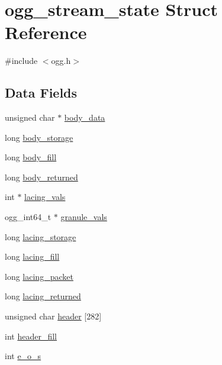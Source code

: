 \hypertarget{structogg__stream__state}{}\section{ogg\+\_\+stream\+\_\+state Struct Reference}
\label{structogg__stream__state}


{\ttfamily \#include $<$ogg.\+h$>$}

\subsection*{Data Fields}
\begin{DoxyCompactItemize}
\item 
unsigned char $\ast$ \hyperlink{structogg__stream__state_a70d03b6f99c1d1e57f55e800b087dae8}{body\+\_\+data}
\item 
long \hyperlink{structogg__stream__state_acc4cf19d7e31e1a6daab8f76fdb0afd6}{body\+\_\+storage}
\item 
long \hyperlink{structogg__stream__state_a19d45a7b5004f13ae02b5a9502354b93}{body\+\_\+fill}
\item 
long \hyperlink{structogg__stream__state_a602e02c9b0d5653eea5bd4f97bade116}{body\+\_\+returned}
\item 
int $\ast$ \hyperlink{structogg__stream__state_a55f3febfdfa9600b66fa2a990297813e}{lacing\+\_\+vals}
\item 
ogg\+\_\+int64\+\_\+t $\ast$ \hyperlink{structogg__stream__state_a5ddadad0bd4d5c5381b21da6f11a7d0c}{granule\+\_\+vals}
\item 
long \hyperlink{structogg__stream__state_a23844488216514760bc66b38dfd6d4ae}{lacing\+\_\+storage}
\item 
long \hyperlink{structogg__stream__state_a6090ad58db768aa90218b0bc421d6f0e}{lacing\+\_\+fill}
\item 
long \hyperlink{structogg__stream__state_add3aba822d7f0e2e23c1927a20aaa683}{lacing\+\_\+packet}
\item 
long \hyperlink{structogg__stream__state_a541d66311781b45cf37d87107d515602}{lacing\+\_\+returned}
\item 
unsigned char \hyperlink{structogg__stream__state_aeb8496ef8051c2760c5d57424f30171a}{header} \mbox{[}282\mbox{]}
\item 
int \hyperlink{structogg__stream__state_af37e7ffba5e7197c8bfabee7a1a6b641}{header\+\_\+fill}
\item 
int \hyperlink{structogg__stream__state_a366e94e72849e0e880d53a22bb9ee646}{e\+\_\+o\+\_\+s}

\end{DoxyCompactItemize}
